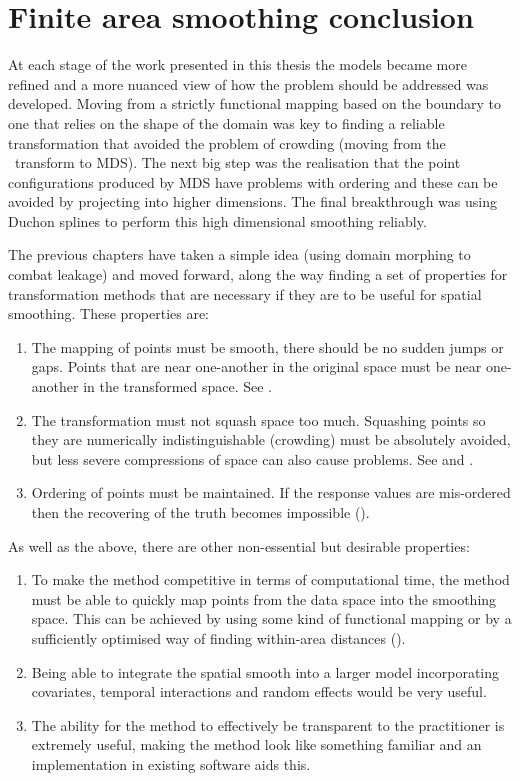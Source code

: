 \section{Finite area smoothing conclusion}
\label{gds-conclusion}

At each stage of the work presented in this thesis the models became more refined and a more nuanced view of how the problem should be addressed was developed. Moving from a strictly functional mapping based on the boundary to one that relies on the shape of the domain was key to finding a reliable transformation that avoided the problem of crowding (moving from the \sch\ transform to MDS). The next big step was the realisation that the point configurations produced by MDS have problems with ordering and these can be avoided by projecting into higher dimensions. The final breakthrough was using Duchon splines to perform this high dimensional smoothing reliably.

The previous chapters have taken a simple idea (using domain morphing to combat leakage) and moved forward, along the way finding a set of properties for transformation methods that are necessary  if they are to be useful for spatial smoothing. These properties are:
\begin{enumerate}
\item The mapping of points must be smooth, there should be no sudden jumps or gaps. Points that are near one-another in the original space must be near one-another in the transformed space. See .
\item The transformation must not squash space too much. Squashing points so they are numerically indistinguishable (crowding) must be absolutely avoided, but less severe compressions of space can also cause problems. See  and .
\item Ordering of points must be maintained. If the response values are mis-ordered then the recovering of the truth becomes impossible ().
\end{enumerate}
As well as the above, there are other non-essential but desirable properties:
\begin{enumerate}
\item To make the method competitive in terms of computational time, the method must be able to quickly map points from the data space into the smoothing space. This can be achieved by using some kind of functional mapping or by a sufficiently optimised way of finding within-area distances ().
\item Being able to integrate the spatial smooth into a larger model incorporating covariates, temporal interactions and random effects would be very useful.
\item The ability for the method to effectively be transparent to the practitioner is extremely useful, making the method look like something familiar and an implementation in existing software aids this.
\end{enumerate}

